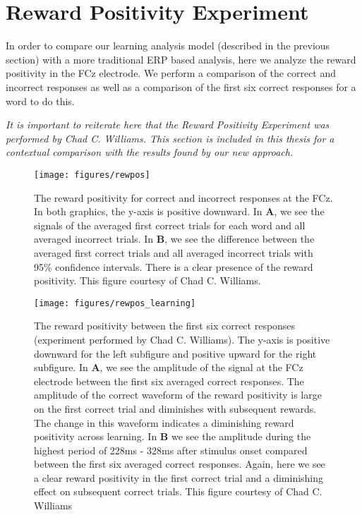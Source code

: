 \section{Reward Positivity Experiment}

In order to compare our learning analysis model (described in the previous 
section) with a more traditional ERP based analysis, here we analyze the reward 
positivity in the FCz electrode. We perform a comparison of the correct and 
incorrect responses as well as a comparison of the first six correct responses 
for a word to do this.

\emph{It is important to reiterate here that the Reward Positivity Experiment 
was performed by Chad C. Williams. This section is included in this thesis for 
a contextual comparison with the results found by our new approach.}

\begin{figure}[p]
  \centerline{
    \texttt{[image: figures/rewpos]}
  }
  \caption[Reward Positivity for Correct and Incorrect Responses]{
    The reward positivity for correct and incorrect responses at the FCz. In 
    both graphics, the y-axis is positive downward. In {\bf A}, we see the 
    signals of the averaged first correct trials for each word and all averaged 
    incorrect trials. In {\bf B}, we see the difference between the averaged 
    first correct trials and all averaged incorrect trials with 95\% confidence 
    intervals. There is a clear presence of the reward positivity. This figure 
    courtesy of Chad C. Williams.
  }
  \label{fig:rewpos}
\end{figure}

\begin{figure}[p]
  \centerline{
    \texttt{[image: figures/rewpos\_learning]}
  }
  \caption[Reward Positivity between the First Six Correct Responses]{
    The reward positivity between the first six correct responses (experiment 
    performed by Chad C. Williams). The y-axis is positive downward for the 
    left subfigure and positive upward for the right subfigure. In {\bf A}, we 
    see the amplitude of the signal at the FCz electrode between the first six 
    averaged correct responses. The amplitude of the correct waveform of the 
    reward positivity is large on the first correct trial and diminishes with 
    subsequent rewards.  The change in this waveform indicates a diminishing 
    reward positivity across learning. In {\bf B} we see the amplitude during 
    the highest period of 228ms - 328ms after stimulus onset compared between 
    the first six averaged correct responses.  Again, here we see a clear 
    reward positivity in the first correct trial and a diminishing effect on 
    subsequent correct trials. This figure courtesy of Chad C. Williams
  }
  \label{fig:rewpos_learning}
\end{figure}

